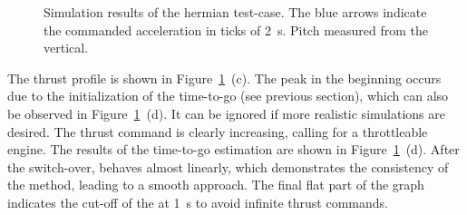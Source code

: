 \documentclass[%
]{aiaa-tc}
\begin{document}
\begin{figure}
    \null\hfill{}\hfill{}\hfill\null 
    \caption{Simulation results of the hermian test-case. The blue arrows
        indicate the commanded acceleration in ticks of \SI{2}{s}. Pitch
        measured from the vertical.}
    \label{fig:mercury}
\end{figure}

The thrust profile is shown in Figure~\ref{fig:mercury}~(c). The peak in the
beginning occurs due to the initialization of the time-to-go (see previous
section), which can also be observed in Figure~\ref{fig:mercury}~(d). It can be
ignored if more realistic simulations are desired. The thrust command is clearly
increasing, calling for a throttleable engine. The results of the time-to-go
estimation are shown in Figure~\ref{fig:mercury}~(d). After the switch-over,
\tgo behaves almost linearly, which demonstrates the consistency of the method,
leading to a smooth approach. The final flat part of the graph indicates the
cut-off of the \tgo at \SI{1}{s} to avoid infinite thrust commands.
\end{document}
